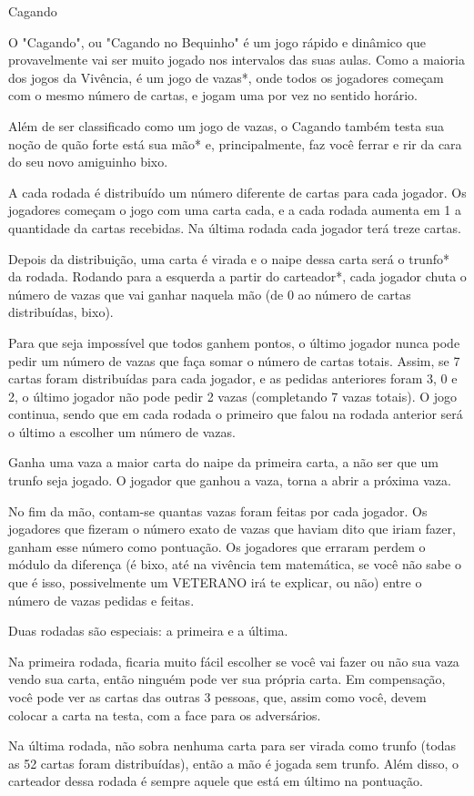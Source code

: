 \begin{subsecao}{Cagando}

O "Cagando", ou "Cagando no Bequinho" é um jogo rápido e dinâmico que
provavelmente vai ser muito jogado nos intervalos das suas aulas. Como a
maioria dos jogos da Vivência, é um jogo de vazas*, onde todos os jogadores
começam com o mesmo número de cartas, e jogam uma por vez no sentido horário. 

Além de ser classificado como um jogo de vazas, o Cagando também testa sua
noção de quão forte está sua mão* e, principalmente, faz você ferrar e rir da
cara do seu novo amiguinho bixo. 

A cada rodada é distribuído um número diferente de cartas para cada jogador. Os
jogadores começam o jogo com uma carta cada, e a cada rodada aumenta em 1 a
quantidade da cartas recebidas. Na última rodada cada jogador terá treze cartas. 

Depois da distribuição, uma carta é virada e o naipe dessa carta será o trunfo*
da rodada. Rodando para a esquerda a partir do carteador*, cada jogador chuta o
número de vazas que vai ganhar naquela mão (de 0 ao número de cartas
distribuídas, bixo). 

Para que seja impossível que todos ganhem pontos, o último jogador nunca pode
pedir um número de vazas que faça somar o número de cartas totais. Assim, se 7
cartas foram distribuídas para cada jogador, e as pedidas anteriores foram 3, 0
e 2, o último jogador não pode pedir 2 vazas (completando 7 vazas totais). O
jogo continua, sendo que em cada rodada o primeiro que falou na rodada anterior
será o último a escolher um número de vazas. 

Ganha uma vaza a maior carta do naipe da primeira carta, a não ser que um
trunfo seja jogado. O jogador que ganhou a vaza, torna a abrir a próxima vaza. 

No fim da mão, contam-se quantas vazas foram feitas por cada jogador. Os
jogadores que fizeram o número exato de vazas que haviam dito que iriam fazer,
ganham esse número como pontuação. Os jogadores que erraram perdem o módulo da
diferença (é bixo, até na vivência tem matemática, se você não sabe o que é
isso, possivelmente um VETERANO irá te explicar, ou não) entre o número de
vazas pedidas e feitas. 

Duas rodadas são especiais: a primeira e a última. 

Na primeira rodada, ficaria muito fácil escolher se você vai fazer ou não sua
vaza vendo sua carta, então ninguém pode ver sua própria carta. Em compensação,
você pode ver as cartas das outras 3 pessoas, que, assim como você, devem
colocar a carta na testa, com a face para os adversários. 

Na última rodada, não sobra nenhuma carta para ser virada como trunfo (todas
as 52 cartas foram distribuídas), então a mão é jogada sem trunfo. Além disso,
o carteador dessa rodada é sempre aquele que está em último na pontuação.

\end{subsecao}
